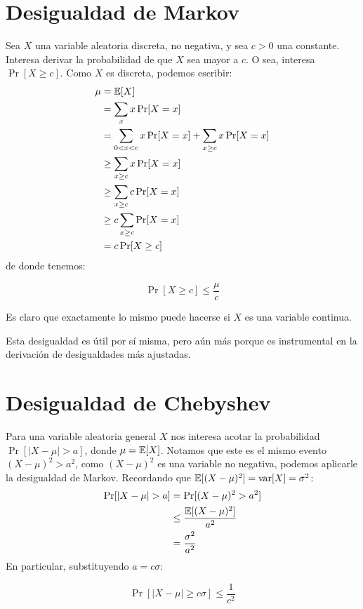 \section{Desigualdad de Markov}
\label{sec:desigualdad-Markov}

  Sea \(X\) una variable aleatoria discreta,
  no negativa,
  y sea \(c > 0\) una constante.
  Interesa derivar la probabilidad de que \(X\) sea mayor a \(c\).
  O sea,
  interesa \(\Pr[ X \ge c ]\).
  Como \(X\) es discreta,
  podemos escribir:
  \begin{align*}
    \mu
      &=   \operatorname{\mathbb{E}}[X] \\
      &=   \sum_{x} x \Pr[X = x] \\
      &=   \sum_{0 < x < c} x \Pr[X = x] + \sum_{x \ge c} x \Pr[X = x] \\
      &\ge \sum_{x \ge c} x \Pr[X = x] \\
      &\ge \sum_{x \ge c} c \Pr[X = x] \\
      &\ge c \sum_{x \ge c} \Pr[X = x] \\
      &=   c \Pr[X \ge c]
  \end{align*}
  de donde tenemos:
  \begin{theorem}
    \label{theo:Markov-inequality}
    \begin{equation}
      \label{eq:Markov-inequality}
      \Pr[X \ge c]
      \le \frac{\mu}{c}
    \end{equation}
  \end{theorem}
  Es claro que exactamente lo mismo puede hacerse si \(X\)
  es una variable continua.

  Esta desigualdad es útil por sí misma,
  pero aún más porque es instrumental
  en la derivación de desigualdades más ajustadas.

\section{Desigualdad de Chebyshev}
\label{sec:desigualdad-Chebyshev}

  Para una variable aleatoria general \(X\)
  nos interesa acotar la probabilidad
  \(\Pr[ \lvert X - \mu \rvert > a ]\),
  donde \(\mu = \operatorname{\mathbb{E}}[X]\).
  Notamos que este es el mismo evento
  \((X - \mu)^2 > a^2\),
  como \((X - \mu)^2\) es una variable no negativa,
  podemos aplicarle la desigualdad de Markov.
  Recordando que \(\operatorname{\mathbb{E}}[ (X - \mu)^2 ] = \operatorname{var}[X] = \sigma^2\):
  \begin{align*}
    \Pr[ \lvert X - \mu \rvert > a ]
      &=   \Pr[ (X - \mu)^2 > a^2 ] \\
      &\le \frac{\operatorname{\mathbb{E}}[ (X - \mu)^2 ]}{a^2} \\
      &=   \frac{\sigma^2}{a^2}
  \end{align*}
  En particular,
  substituyendo \(a = c \sigma\):
  \begin{theorem}
    \label{theo:Chebyshev}
    \begin{equation}
      \label{eq:Chebyshev}
      \Pr[ \lvert X - \mu \rvert \ge c \sigma ]
      \le \frac{1}{c^2}
    \end{equation}
  \end{theorem}

